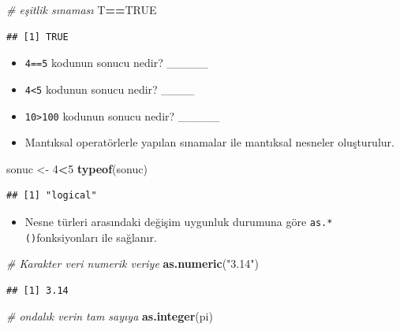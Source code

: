 \documentclass[
  oneside]{book}
\newenvironment{Shaded}{\begin{snugshade}}{\end{snugshade}}
\newcommand{\CommentTok}[1]{\textcolor[rgb]{0.56,0.35,0.01}{\textit{#1}}}
\newcommand{\ConstantTok}[1]{\textcolor[rgb]{0.56,0.35,0.01}{#1}}
\newcommand{\DecValTok}[1]{\textcolor[rgb]{0.00,0.00,0.81}{#1}}
\newcommand{\FunctionTok}[1]{\textcolor[rgb]{0.13,0.29,0.53}{\textbf{#1}}}
\newcommand{\NormalTok}[1]{#1}
\newcommand{\OtherTok}[1]{\textcolor[rgb]{0.56,0.35,0.01}{#1}}
\newcommand{\SpecialCharTok}[1]{\textcolor[rgb]{0.81,0.36,0.00}{\textbf{#1}}}
\newcommand{\StringTok}[1]{\textcolor[rgb]{0.31,0.60,0.02}{#1}}
\providecommand{\tightlist}{%
  \setlength{\itemsep}{0pt}\setlength{\parskip}{0pt}}
\begin{document}
\begin{Shaded}
\begin{Highlighting}[]
\CommentTok{\# eşitlik sınaması}
\NormalTok{T}\SpecialCharTok{==}\ConstantTok{TRUE}
\end{Highlighting}
\end{Shaded}

\begin{verbatim}
## [1] TRUE
\end{verbatim}

\begin{itemize}
\item
  \texttt{4==5} kodunun sonucu nedir? \_\_\_\_\_
\item
  \texttt{4\textless{}5} kodunun sonucu nedir? \_\_\_\_
\item
  \texttt{10\textgreater{}100} kodunun sonucu nedir? \_\_\_\_\_
\item
  Mantıksal operatörlerle yapılan sınamalar ile mantıksal nesneler oluşturulur.
\end{itemize}

\begin{Shaded}
\begin{Highlighting}[]
\NormalTok{sonuc }\OtherTok{\textless{}{-}} \DecValTok{4}\SpecialCharTok{\textless{}}\DecValTok{5}
\FunctionTok{typeof}\NormalTok{(sonuc)}
\end{Highlighting}
\end{Shaded}

\begin{verbatim}
## [1] "logical"
\end{verbatim}

\begin{itemize}
\tightlist
\item
  Nesne türleri arasındaki değişim uygunluk durumuna göre \texttt{as.*()}fonksiyonları ile sağlanır.
\end{itemize}

\begin{Shaded}
\begin{Highlighting}[]
\CommentTok{\# Karakter veri numerik veriye}
\FunctionTok{as.numeric}\NormalTok{(}\StringTok{"3.14"}\NormalTok{)}
\end{Highlighting}
\end{Shaded}

\begin{verbatim}
## [1] 3.14
\end{verbatim}

\begin{Shaded}
\begin{Highlighting}[]
\CommentTok{\# ondalık verin tam sayıya}
\FunctionTok{as.integer}\NormalTok{(pi)}
\end{Highlighting}
\end{Shaded}
\end{document}
